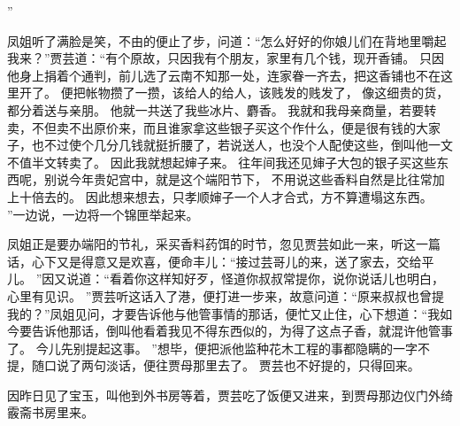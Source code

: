 ”\par
凤姐听了满脸是笑，不由的便止了步，问道：“怎么好好的你娘儿们在背地里嚼起我来？”贾芸道：“有个原故，只因我有个朋友，家里有几个钱，现开香铺。
只因他身上捐着个通判，前儿选了云南不知那一处，连家眷一齐去，把这香铺也不在这里开了。
便把帐物攒了一攒，该给人的给人，该贱发的贱发了，
像这细贵的货，都分着送与亲朋。
他就一共送了我些冰片、麝香。
我就和我母亲商量，若要转卖，不但卖不出原价来，而且谁家拿这些银子买这个作什么，便是很有钱的大家子，也不过使个几分几钱就挺折腰了，若说送人，也没个人配使这些，倒叫他一文不值半文转卖了。
因此我就想起婶子来。
往年间我还见婶子大包的银子买这些东西呢，别说今年贵妃宫中，就是这个端阳节下，
不用说这些香料自然是比往常加上十倍去的。
因此想来想去，只孝顺婶子一个人才合式，方不算遭塌这东西。
”一边说，一边将一个锦匣举起来。
\par
凤姐正是要办端阳的节礼，采买香料药饵的时节，忽见贾芸如此一来，听这一篇话，心下又是得意又是欢喜，便命丰儿：“接过芸哥儿的来，送了家去，交给平儿。
”因又说道：“看着你这样知好歹，怪道你叔叔常提你，说你说话儿也明白，心里有见识。
”贾芸听这话入了港，便打进一步来，故意问道：“原来叔叔也曾提我的？”凤姐见问，才要告诉他与他管事情的那话，便忙又止住，心下想道：“我如今要告诉他那话，倒叫他看着我见不得东西似的，为得了这点子香，就混许他管事了。
今儿先别提起这事。
”想毕，便把派他监种花木工程的事都隐瞒的一字不提，随口说了两句淡话，便往贾母那里去了。
贾芸也不好提的，只得回来。
\par
因昨日见了宝玉，叫他到外书房等着，贾芸吃了饭便又进来，到贾母那边仪门外绮霰斋书房里来。
